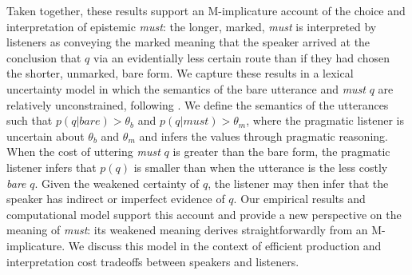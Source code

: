 \documentclass[11pt]{article}
\begin{document}
Taken together, these results support an M-implicature \cite{levinson2000} account of the choice and interpretation of epistemic \textit{must}: the longer, marked, \textit{must} is interpreted by listeners as conveying the marked meaning that the speaker arrived at the conclusion that $q$ via an evidentially less certain route than if they had chosen the shorter, unmarked, bare form. %
We capture these results in a lexical uncertainty model in which the semantics of the bare utterance and \textit{must} $q$ are relatively unconstrained, following \cite{bergen, lassiter}. We define the semantics of the utterances such that $p(q | \textit{bare} ) > \theta_b$ and $p(q | \textit{must} ) > \theta_m$, where the pragmatic listener is uncertain about $\theta_b$ and $\theta_m$ and infers the values through pragmatic reasoning. When the cost of uttering \textit{must} $q$ is greater than the bare form, the pragmatic listener infers that $p(q)$ is smaller than when the utterance is the less costly \textit{bare} $q$. %
Given the weakened certainty of $q$, the listener may then infer that the speaker has indirect or imperfect evidence of $q$. Our empirical results and computational model  support this account and provide a new perspective on the meaning of \textit{must}: its weakened meaning derives straightforwardly from an M-implicature. We discuss this model in the context of efficient production and interpretation cost tradeoffs between speakers and listeners.
%
\end{document}
